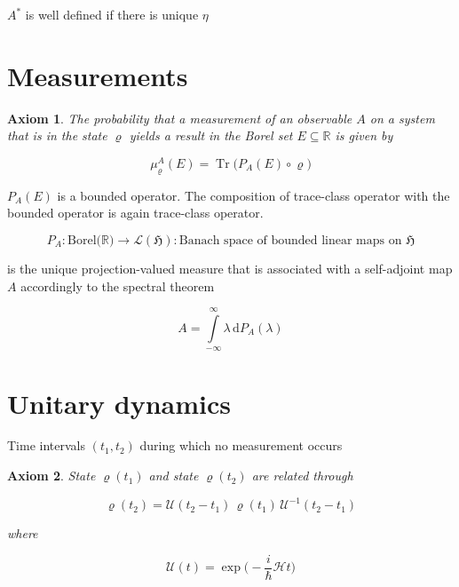 \documentclass{article}
\newtheorem{axiom}{Axiom}
\DeclareMathOperator{\tr}{Tr}
\begin{document}
$A^{*}$ is well defined if there is unique $\eta$

\section{Measurements}

\begin{axiom}
The probability that a measurement of an observable $A$ on a system that is in the state $\varrho$ yields a result in the Borel set $E \subseteq \mathbb{R}$ is given by

\begin{equation*}
\mu_{\varrho}^{A}(E) = \tr\big( P_A(E) \circ \varrho \big)
\end{equation*}

\end{axiom}

$P_A(E)$ is a bounded operator. The composition of trace-class operator with the bounded operator is again trace-class operator.

\begin{equation*}
P_A:\text{Borel($\mathbb{R}$)} \longrightarrow \mathcal{L}(\mathfrak{H}):\text{Banach space of bounded linear maps on $\mathfrak{H}$}
\end{equation*}

is the unique projection-valued measure that is associated with a self-adjoint map $A$ accordingly to the spectral theorem

\begin{equation*}
A = \int\limits_{-\infty}^{\infty} \lambda \, \mathrm{d}P_A(\lambda)
\end{equation*}

\section{Unitary dynamics}

Time intervals $(t_1, t_2)$ during which no measurement occurs

\begin{axiom}
State $\varrho(t_1)$ and state $\varrho(t_2)$ are related through

\begin{equation*}
\varrho(t_2) = \mathcal{U}(t_2 - t_1)\, \varrho(t_1)\, \mathcal{U}^{-1}(t_2 - t_1)
\end{equation*}

where

\begin{equation*}
\mathcal{U}(t) = \exp{\Big(-\dfrac{i}{\hbar} \mathcal{H} t\Big)}
\end{equation*}

\end{axiom}
\end{document}
